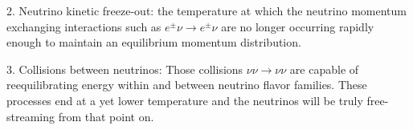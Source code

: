 2. Neutrino kinetic freeze-out: the temperature at which the neutrino momentum exchanging interactions such as $e^\pm\nu\to e^\pm\nu$ are no longer occurring rapidly enough to maintain an equilibrium momentum distribution. %

3. Collisions between neutrinos:
Those collisions $\nu\nu\to\nu\nu$ are capable of reequilibrating energy within and between neutrino flavor families. These processes end at a yet lower temperature and the neutrinos will be truly free-streaming from that point on.
 





